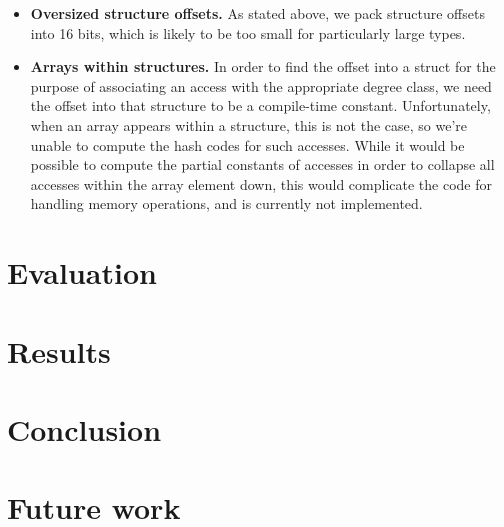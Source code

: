 \documentclass[12pt]{article}
\begin{document}
\begin{itemize}
\item \textbf{Oversized structure offsets.}
As stated above, we pack structure offsets into 16 bits, which is likely to be too small for particularly large types.

\item \textbf{Arrays within structures.}
In order to find the offset into a struct for the purpose of associating an access with the appropriate degree class, we need the offset into that structure to be a compile-time constant.
Unfortunately, when an array appears within a structure, this is not the case, so we're unable to compute the hash codes for such accesses.
While it would be possible to compute the partial constants of accesses in order to collapse all accesses within the array element down, this would complicate the code for handling memory operations, and is currently not implemented.
\end{itemize}

\section{Evaluation}

\section{Results}

\section{Conclusion}

\section{Future work}



\end{document}
